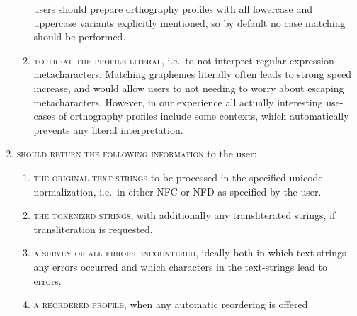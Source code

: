 \begin{enumerate}
\begin{enumerate}
        users should prepare orthography profiles with all lowercase and
        uppercase variants explicitly mentioned, so by default no case matching
        should be performed. 
		\item \textsc{to treat the profile literal}, i.e.~to not interpret regular
        expression metacharacters. Matching graphemes literally often leads to
        strong speed increase, and would allow users to not needing to worry
        about escaping metacharacters. However, in our experience all actually
        interesting use-cases of orthography profiles include some contexts,
        which automatically prevents any literal interpretation.
    \end{enumerate}
	\item \textsc{should return the following information} to the user:
	\begin{enumerate}
		\def\labelenumii{C\arabic{enumii}.} \setcounter{enumii}{8} 
		\item \textsc{the original text-strings} to be processed in the specified
        unicode normalization, i.e.~in either NFC or NFD as specified by the
        user. 
		\item \textsc{the tokenized strings}, with additionally any transliterated
        strings, if transliteration is requested. 
		\item \textsc{a survey of all errors encountered}, ideally both in which
        text-strings any errors occurred and which characters in the
        text-strings lead to errors. 
		\item \textsc{a reordered profile}, when any automatic reordering is offered 
	\end{enumerate}
\end{enumerate}

